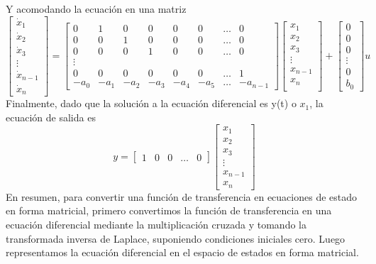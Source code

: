 Y acomodando la ecuación en una matriz
\begin{equation}
	\begin{bmatrix}
		\dot{x}_1     \\
		\dot{x}_2     \\
		\dot{x}_3     \\
		\vdots        \\
		\dot{x}_{n-1} \\
		\dot{x}_n
	\end{bmatrix}
	=
	\begin{bmatrix}
		0    & 1    & 0    & 0    & 0    & 0    & \dots & 0        \\
		0    & 0    & 1    & 0    & 0    & 0    & \dots & 0        \\
		0    & 0    & 0    & 1    & 0    & 0    & \dots & 0        \\
		\vdots                                                     \\
		0    & 0    & 0    & 0    & 0    & 0    & \dots & 1        \\
		-a_0 & -a_1 & -a_2 & -a_3 & -a_4 & -a_5 & \dots & -a_{n-1}
	\end{bmatrix}
	\begin{bmatrix}
		x_1     \\
		x_2     \\
		x_3     \\
		\vdots  \\
		x_{n-1} \\
		x_n     \\
	\end{bmatrix}
	+
	\begin{bmatrix}
		0      \\
		0      \\
		0      \\
		\vdots \\
		0      \\
		b_0
	\end{bmatrix}
	u
\end{equation}
Finalmente, dado que la solución a la ecuación diferencial es y(t) o $x_1$, la ecuación de salida es
\begin{equation}
	y =
	\begin{bmatrix}
		1 & 0 & 0 & \dots & 0
	\end{bmatrix}
	\begin{bmatrix}
		x_1     \\
		x_2     \\
		x_3     \\
		\vdots  \\
		x_{n-1} \\
		x_n
	\end{bmatrix}
\end{equation}
En resumen, para convertir una función de transferencia en ecuaciones de estado en forma matricial, primero convertimos la función de
transferencia en una ecuación diferencial mediante la multiplicación cruzada y tomando la transformada inversa de Laplace, suponiendo
condiciones iniciales cero. Luego representamos la ecuación diferencial en el espacio de estados en forma matricial.


